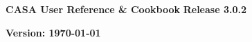 \pagestyle{empty}

\begin{center}
\Huge
{\bf CASA User Reference \& Cookbook} 
\break 
\break 
\huge
{\bf Release 3.0.2}
\break 
\end{center}
\normalsize

\begin{figure}[h!]
\begin{center}
\end{center}
\end{figure}


\Large
\begin{center}
{\bf Version: \today}
\end{center}
\normalsize

\pagebreak
